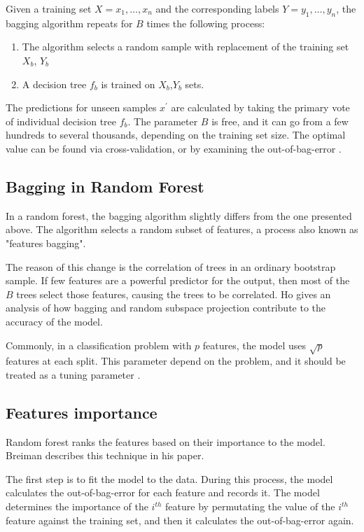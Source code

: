 Given a training set $X = x_1,\dots,x_n$ and the corresponding labels $Y = y_1, \dots, y_n$, the bagging algorithm repeats for $B$ times the following process:
\begin{enumerate}
	\item The algorithm selects a random sample with replacement of the training set $X_b$, $Y_b$
	\item A decision tree $f_b$ is trained on $X_b$,$Y_b$ sets.
\end{enumerate}


The predictions for unseen samples $x^\prime$ are calculated by taking the primary vote of individual decision tree $f_b$.
The parameter $B$ is free, and it can go from a few hundreds to several thousands, depending on the training set size. The optimal value can be found via cross-validation, or by examining the out-of-bag-error \cite{james2013introduction}.

\subsection{Bagging in Random Forest}
In a random forest, the bagging algorithm slightly differs from the one presented above. The algorithm selects a random subset of features, a process also known as "features bagging".

The reason of this change is the correlation of trees in an ordinary bootstrap sample. If few features are a powerful predictor for the output, then most of the $B$ trees select those features, causing the trees to be correlated. Ho \cite{ho2002data} gives an analysis of how bagging and random subspace projection contribute to the accuracy of the model. 

Commonly, in a classification problem with $p$ features, the model uses $\sqrt{p}$ features at each split. This parameter depend on the problem, and it should be treated as a tuning parameter \cite{hastie2009elements}.

\subsection{Features importance}
Random forest ranks the features based on their importance to the model. Breiman \cite{breiman2001random} describes this technique in his paper. 

The first step is to fit the model to the data. During this process, the model calculates the out-of-bag-error for each feature and records it. The model determines the importance of the $i^{th}$ feature by permutating the value of the $i^{th}$ feature against the training set, and then it calculates the out-of-bag-error again. 

